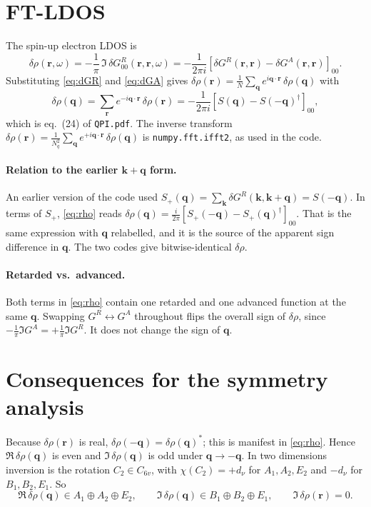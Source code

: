 \documentclass[11pt]{article}
\newcommand{\bk}{\mathbf{k}}
\newcommand{\bq}{\mathbf{q}}
\newcommand{\br}{\mathbf{r}}
\newcommand{\GR}{G^{R}}
\newcommand{\GA}{G^{A}}
\begin{document}
\section{FT-LDOS}

The spin-up electron LDOS is
\begin{equation}
  \delta\rho(\br,\omega) = -\frac{1}{\pi}\,\Im\, \delta\GR_{00}(\br,\br,\omega)
  = -\frac{1}{2\pi i}\left[\delta\GR(\br,\br) - \delta\GA(\br,\br)\right]_{00}.
\end{equation}
Substituting \eqref{eq:dGR} and \eqref{eq:dGA} gives $\delta\rho(\br) = \frac{1}{N}\sum_{\bq} e^{i\bq\cdot\br}\,\delta\rho(\bq)$ with
\begin{equation}
  \boxed{\;
  \delta\rho(\bq) = \sum_{\br} e^{-i\bq\cdot\br}\,\delta\rho(\br)
  = -\frac{1}{2\pi i}\left[S(\bq) - S(-\bq)^{\dagger}\right]_{00} , \;}
  \label{eq:rho}
\end{equation}
which is eq.~(24) of \texttt{QPI.pdf}. The inverse transform $\delta\rho(\br) = \frac{1}{N_q^2}\sum_{\bq} e^{+i\bq\cdot\br}\,\delta\rho(\bq)$ is \texttt{numpy.fft.ifft2}, as used in the code.

\paragraph{Relation to the earlier $\bk+\bq$ form.}
An earlier version of the code used $S_{+}(\bq) = \sum_{\bk}\delta\GR(\bk,\bk+\bq) = S(-\bq)$. In terms of $S_{+}$, \eqref{eq:rho} reads $\delta\rho(\bq) = \frac{i}{2\pi}\left[S_{+}(-\bq) - S_{+}(\bq)^{\dagger}\right]_{00}$. That is the same expression with $\bq$ relabelled, and it is the source of the apparent sign difference in $\bq$. The two codes give bitwise-identical $\delta\rho$.

\paragraph{Retarded vs.\ advanced.}
Both terms in \eqref{eq:rho} contain one retarded and one advanced function at the same $\bq$. Swapping $\GR \leftrightarrow \GA$ throughout flips the overall sign of $\delta\rho$, since $-\frac{1}{\pi}\Im\GA = +\frac{1}{\pi}\Im\GR$. It does not change the sign of $\bq$.

\section{Consequences for the symmetry analysis}

Because $\delta\rho(\br)$ is real, $\delta\rho(-\bq) = \delta\rho(\bq)^{*}$; this is manifest in \eqref{eq:rho}. Hence $\Re\,\delta\rho(\bq)$ is even and $\Im\,\delta\rho(\bq)$ is odd under $\bq\to-\bq$. In two dimensions inversion is the rotation $C_2 \in C_{6v}$, with $\chi(C_2) = +d_\nu$ for $A_1, A_2, E_2$ and $-d_\nu$ for $B_1, B_2, E_1$. So
\begin{equation}
  \Re\,\delta\rho(\bq) \in A_1 \oplus A_2 \oplus E_2,
  \qquad
  \Im\,\delta\rho(\bq) \in B_1 \oplus B_2 \oplus E_1,
  \qquad
  \Im\,\delta\rho(\br) = 0 .
\end{equation}
\end{document}
